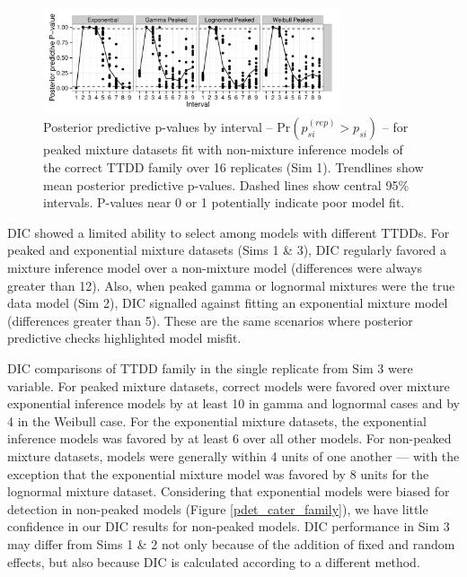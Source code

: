 \documentclass[useAMS,usenatbib,referee,12pt]{article}
\begin{document}
\begin{figure}[h!]\centering
\includegraphics[width=0.78\textwidth]{Sims/SimZero/PostPredP_corr.pdf}
\caption{\label{postpredmix} Posterior predictive p-values by interval -- Pr$\left(p_{si}^{(rep)} > p_{si}\right)$ -- for peaked mixture datasets fit with non-mixture inference models of the correct TTDD family over 16 replicates (Sim 1).  
Trendlines show mean posterior predictive p-values.  
Dashed lines show central 95\% intervals.  
P-values near 0 or 1 potentially indicate poor model fit.}
\end{figure}

DIC showed a limited ability to select among models with different TTDDs.  
For peaked and exponential mixture datasets (Sims 1 \& 3), DIC regularly favored a mixture inference model over a non-mixture model (differences were always greater than 12).  
Also, when peaked gamma or lognormal mixtures were the true data model (Sim 2), DIC signalled against fitting an exponential mixture model (differences greater than 5).  
These are the same scenarios where posterior predictive checks highlighted model misfit.

DIC comparisons of TTDD family in the single replicate from Sim 3 were variable.  
For peaked mixture datasets, correct models were favored over mixture exponential inference models by at least 10 in gamma and lognormal cases and by 4 in the Weibull case.  
For the exponential mixture datasets, the exponential inference models was favored by at least 6 over all other models.  
For non-peaked mixture datasets, models were generally within 4 units of one another --- with the exception that the exponential mixture model was favored by 8 units for the lognormal mixture dataset.  
Considering that exponential models were biased for detection in non-peaked models (Figure \ref{pdet_cater_family}), we have little confidence in our DIC results for non-peaked models.  
DIC performance in Sim 3 may differ from Sims 1 \& 2 not only because of the addition of fixed and random effects, but also because DIC is calculated according to a different method.
\end{document}
